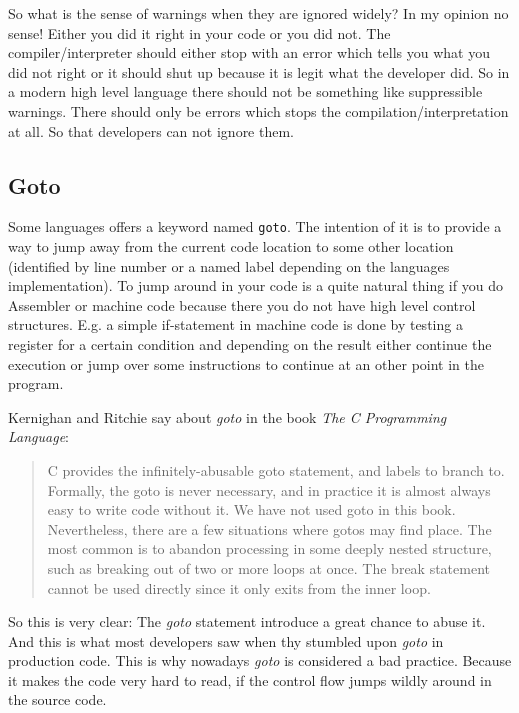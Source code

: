 \documentclass[11pt, a4paper]{report}
\begin{document}
So what is the sense of warnings when they are ignored widely? In my opinion no sense! Either you did it right in your code or you did not. The compiler/interpreter should either stop with an error which tells you what you did not right or it should shut up because it is legit what the developer did. So in a modern high level language there should not be something like suppressible warnings. There should only be errors which stops the compilation/interpretation at all. So that developers can not ignore them.

\subsection{Goto}

Some languages offers a keyword named \texttt{goto}. The intention of it is to provide a way to jump away from the current code location to some other location (identified by line number or a named label depending on the languages implementation). To jump around in your code is a quite natural thing if you do Assembler or machine code because there you do not have high level control structures. E.g. a simple if-statement in machine code is done by testing a register for a certain condition and depending on the result either continue the execution or jump over some instructions to continue at an other point in the program.

Kernighan and Ritchie say about \textit{goto} in the book \textit{The C Programming Language}\cite{c-programming-lang}:

\begin{quotation}
    C provides the infinitely-abusable goto statement, and labels to branch to. Formally, the goto is never necessary, and in practice it is almost always easy to write code without it. We have not used goto in this book.
    Nevertheless, there are a few situations where gotos may find place. The most common is to abandon processing in some deeply nested structure, such as breaking out of two or more loops at once. The break statement cannot be used directly since it only exits from the inner loop.
\end{quotation}

So this is very clear: The \textit{goto} statement introduce a great chance to abuse it. And this is what most developers saw when thy stumbled upon \textit{goto} in production code. This is why nowadays \textit{goto} is considered a bad practice. Because it makes the code very hard to read, if the control flow jumps wildly around in the source code.
\end{document}
